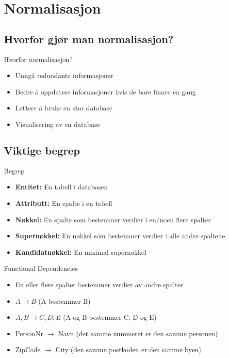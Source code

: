 \section{Normalisasjon}
\subsection*{Hvorfor gjør man normalisasjon?}
\begin{frame}{Hvorfor normalisasjon?}
\begin{itemize}[<+->]
    \item Unngå redundante informasjoner
    \item Bedre å oppdatere informasjoner hvis de bare finnes en gang
    \item Lettere å bruke en stor database
    \item Visualisering av en database
\end{itemize}
\end{frame}

\subsection*{Viktige begrep}
\begin{frame}{Begrep}
\begin{itemize}[<+->]
    \item \textbf{Entitet: }En tabell i databasen
    \item \textbf{Attributt: }En spalte i en tabell
    \item \textbf{Nøkkel: }En spalte som bestemmer verdier i en/noen flere spalter
    \item \textbf{Supernøkkel: }En nøkkel som bestemmer verdier i alle andre spaltene
    \item \textbf{Kandidatnøkkel: }En minimal supernøkkel
\end{itemize}
\end{frame}

\begin{frame}{Functional Dependencies}
\begin{itemize}[<+->]
    \item En eller flere spalter bestemmer verdier av andre spalter
    \item $A \rightarrow B$ (A bestemmer B)
    \item $A,B \rightarrow C, D, E$ (A og B bestemmer C, D og E)
    \item PersonNr $\rightarrow$ Navn (det samme nummeret er den samme personen)
    \item ZipCode $\rightarrow$ City (den samme postkoden er den samme byen)
\end{itemize}
\end{frame}

